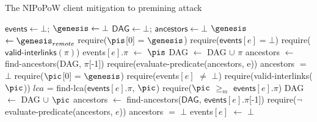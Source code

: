 \begin{algorithm}[H]

    \caption{\label{alg:avoid-premining}The \textsf{NIPoPoW} client mitigation
    to premining attack}
    \begin{algorithmic}[1]

    \State $\textsf{events} \gets \bot$; $\genesis \gets \bot$
    \State $\textsf{DAG} \gets \bot$; $\textsf{ancestors} \gets \bot$
        \State $\genesis$ $\gets \genesis_{remote}$
    \EndFunction
        \State \textsf{require}($\pis$[0] = $\genesis$)
        \State \textsf{require}($\textsf{events$[e]$} = \bot$)
        \State \textsf{require}($\textsf{valid-interlinks}(\pi)$)
        \State \textsf{events$[e].\pi$} $\gets$ $\pis$
        \State \textsf{DAG} $\gets$ \textsf{DAG} $\cup$ $\pi$
        \State \textsf{ancestors} $\gets$ \textsf{find-ancestors(DAG, $\pi$[-1])}
        \State \textsf{require}(\textsf{evaluate-predicate}(\textsf{ancestors}, e))
        \State \textsf{ancestors} $=$ $\bot$
        \EndFunction
        \State \textsf{require}($\pic$[0] = $\genesis$)
        \State \textsf{require}(\textsf{events}$[e]$ $\ne$ $\bot$)
        \State \textsf{require}(\textsf{valid-interlinks}($\pic$))
        \State $lca$ = \textsf{find-lca}($\textsf{events}[e].\pi$, $\pic$)
        \State \textsf{require}($\pic$ $\geq_m$ $\textsf{events}[e].\pi$)
        \State \textsf{DAG} $\gets$ \textsf{DAG} $\cup$ $\pic$
        \State \textsf{ancestors} $\gets$
        \textsf{find-ancestors}($\textsf{DAG}$, $\textsf{events}[e].\pi$[-1])
        \State \textsf{require}($\neg$\textsf{evaluate-predicate}(\textsf{ancestors}, $e$))
        \State \textsf{ancestors} $=$ $\bot$
        \State \textsf{events$[e]$} $\gets$ $\bot$
    \EndFunction
    \EndContract
    \vskip8pt
    \end{algorithmic}
\end{algorithm}

